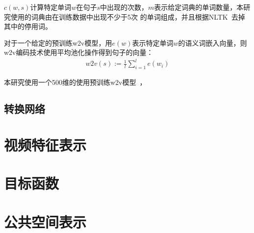 $c(w,s)$计算特定单词$w$在句子$s$中出现的次数，$m$表示给定词典的单词数量，本研究使用的词典由在训练数据中出现不少于5次
的单词组成，并且根据NLTK~\cite{}去掉其中的停用词。

对于一个给定的预训练w2v模型，用$e(w)$表示特定单词$w$的语义词嵌入向量，则w2v编码技术使用平均池化操作得到句子的向量：
\begin{equation}
    \label{eq:w2v}
    \begin{aligned}
        w2v(s) := \frac{1}{l}\sum^l_{i=1}e(w_i)
    \end{aligned}
\end{equation}

本研究使用一个500维的使用预训练w2v模型~\cite{}，


\subsection{转换网络}



\section{视频特征表示}


\section{目标函数}




\section{公共空间表示}




